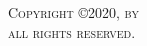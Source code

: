 \newpage
\thispagestyle{empty}
\addtocounter{page}{-1}
\vspace*{\fill}
\scshape \noindent Copyright \copyright 2020, by \authorname \\
\noindent all rights reserved.
\vspace*{\fill}
\newpage
\rm
